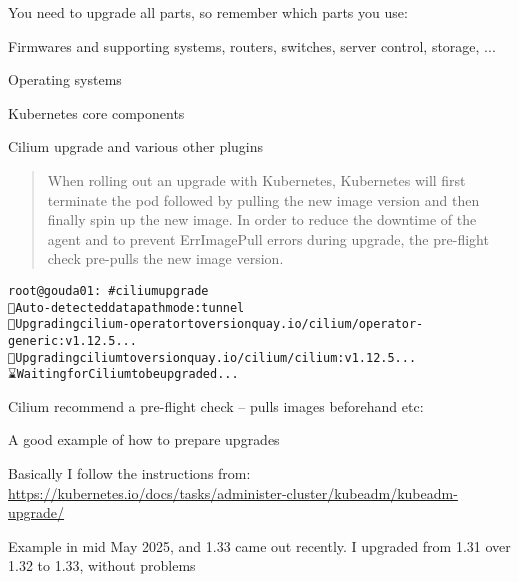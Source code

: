 \documentclass[Screen16to9,17pt]{foils}
\begin{document}

You need to upgrade all parts, so remember which parts you use:
\begin{list2}
\item Firmwares and supporting systems, routers, switches, server control, storage, ...
\item Operating systems
\item Kubernetes core components
\item Cilium upgrade and various other plugins
\end{list2}



\begin{quote}
When rolling out an upgrade with Kubernetes, Kubernetes will first terminate the pod followed by pulling the new image version and then finally spin up the new image. In order to reduce the downtime of the agent and to prevent ErrImagePull errors during upgrade, the pre-flight check pre-pulls the new image version.
\end{quote}

\begin{alltt}\footnotesize
root@gouda01:~# cilium upgrade
🔮 Auto-detected datapath mode: tunnel
🚀 Upgrading cilium-operator to version quay.io/cilium/operator-generic:v1.12.5...
🚀 Upgrading cilium to version quay.io/cilium/cilium:v1.12.5...
⌛ Waiting for Cilium to be upgraded...

\end{alltt}

\begin{list2}
\item Cilium recommend a pre-flight check -- pulls images beforehand etc:\\
\item A good example of how to prepare upgrades
\end{list2}




Basically I follow the instructions from:\\
\url{https://kubernetes.io/docs/tasks/administer-cluster/kubeadm/kubeadm-upgrade/}

Example in mid May 2025, and 1.33 came out recently. I upgraded from 1.31 over 1.32 to 1.33, without problems
\end{document}
